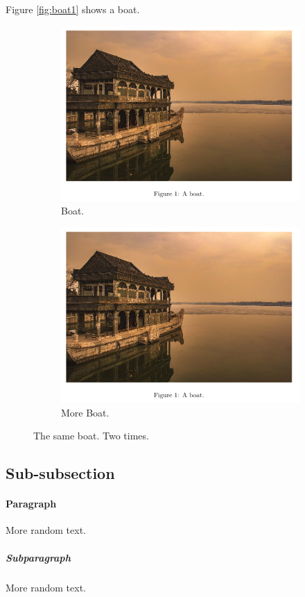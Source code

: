 \documentclass{article}
\begin{document}
	Figure \ref{fig:boat1} shows a boat.
	
	\begin{figure}[!ht]
		\centering
		\begin{subfigure}[b]{0.4\linewidth}
			\includegraphics[width=\linewidth]{source/boat.jpg}
			\caption{Boat.}
		\end{subfigure}
		\begin{subfigure}[b]{0.4\linewidth}
			\includegraphics[width=\linewidth]{source/boat.jpg}
			\caption{More Boat.}
		\end{subfigure}
		\caption{The same boat. Two times.}
		\label{fig:coffee}
	\end{figure}
	
	
	\subsection{Sub-subsection}
	
	\paragraph{Paragraph}
	More random text.
	
	\subparagraph{Subparagraph}
	More random text.
	
\end{document}

